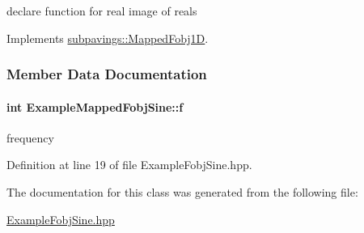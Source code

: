 declare function for real image of reals 



\-Implements \hyperlink{classsubpavings_1_1MappedFobj1D_abee3fbd4c06d7d2f6e276f31d485eb7c}{subpavings\-::\-Mapped\-Fobj1\-D}.



\subsubsection{\-Member \-Data \-Documentation}
\hypertarget{classExampleMappedFobjSine_a2156ab4e25cabbd91fd661076a9a39c5}{
\paragraph[{f}]{\setlength{\rightskip}{0pt plus 5cm}int {\bf \-Example\-Mapped\-Fobj\-Sine\-::f}}}\label{classExampleMappedFobjSine_a2156ab4e25cabbd91fd661076a9a39c5}


frequency 



\-Definition at line 19 of file \-Example\-Fobj\-Sine.\-hpp.



\-The documentation for this class was generated from the following file\-:\begin{DoxyCompactItemize}
\item 
\hyperlink{ExampleFobjSine_8hpp}{\-Example\-Fobj\-Sine.\-hpp}\end{DoxyCompactItemize}
